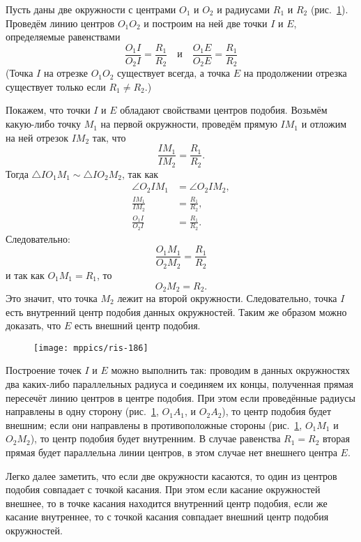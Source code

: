 Пусть даны две окружности с центрами $O_1$ и $O_2$ и радиусами $R_1$ и $R_2$ (рис.~\ref{1938/ris-186}).
Проведём линию центров $O_1O_2$ и построим на ней две точки $I$ и $E$, определяемые равенствами
\[\frac{O_1I}{O_2I}=\frac{R_1}{R_2}\quad\text{и}\quad\frac{O_1E}{O_2E}=\frac{R_1}{R_2}\]
(Точка $I$ на отрезке $O_1O_2$ существует всегда, а точка $E$ на продолжении отрезка существует только если $R_1\ne R_2$.)

Покажем, что точки $I$ и $E$ обладают свойствами центров подобия.
Возьмём какую-либо точку $M_1$ на первой окружности, проведём прямую $IM_1$ и отложим на ней отрезок $IM_2$ так, что 
\[\frac{IM_1}{IM_2}=\frac{R_1}{R_2}.\] 
Тогда $\triangle IO_1M_1\sim\triangle IO_2M_2$, так как 
\begin{align*}
\angle O_2IM_1&=\angle O_2IM_2,
\\
\frac{IM_1}{IM_2}&=\frac{R_1}{R_2},
\\
\frac{O_1I}{O_2I}&=\frac{R_1}{R_2}.
\end{align*}
Следовательно:
\[\frac{O_1M_1}{O_2M_2}=\frac{R_1}{R_2}\]
и так как $O_1M_1=R_1$, то
\[O_2M_2=R_2.\]
Это значит, что точка $M_2$ лежит на второй окружности.
Следовательно, точка $I$ есть внутренний центр подобия данных окружностей.
Таким же образом можно доказать, что $E$ есть внешний центр подобия.

\begin{figure}[h]
\centering
\texttt{[image: mppics/ris-186]}
\caption{}\label{1938/ris-186}
\end{figure}

Построение точек $I$ и $E$ можно выполнить так:
проводим в данных окружностях два каких-либо параллельных радиуса и соединяем их концы, полученная прямая пересечёт линию центров в центре подобия.
При этом если проведённые радиусы направлены в одну сторону (рис.~\ref{1938/ris-186}, $O_1A_1$, и $O_2A_2$), то центр подобия будет внешним;
если они направлены в противоположные стороны (рис.~\ref{1938/ris-186}, $O_1M_1$ и $O_2M_2$), то центр подобия будет внутренним.
В случае равенства $R_1=R_2$ вторая прямая будет параллельна линии центров, в этом случае нет внешнего центра $E$.

\smallskip

Легко далее заметить, что если две окружности касаются, то один из центров подобия совпадает с точкой касания.
При этом если касание окружностей внешнее, то в точке касания находится внутренний центр подобия, если же касание внутреннее, то с точкой касания совпадает внешний центр подобия окружностей.

